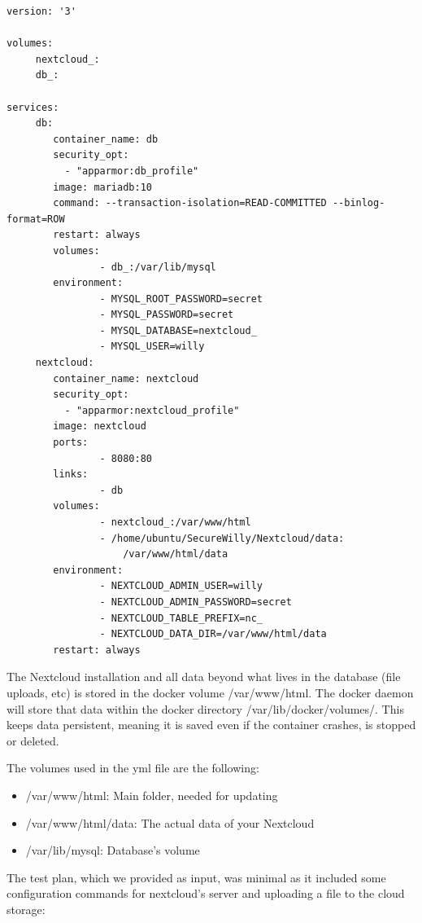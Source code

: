 \begin{lstlisting}[style=Dockerfile, caption={Nextcloud's docker-compose.yml}]
version: '3'

volumes:
     nextcloud_:
     db_:

services:
     db:
        container_name: db
        security_opt:
          - "apparmor:db_profile"
        image: mariadb:10
        command: --transaction-isolation=READ-COMMITTED --binlog-format=ROW
        restart: always
        volumes:
                - db_:/var/lib/mysql
        environment:
                - MYSQL_ROOT_PASSWORD=secret
                - MYSQL_PASSWORD=secret
                - MYSQL_DATABASE=nextcloud_
                - MYSQL_USER=willy
     nextcloud:
        container_name: nextcloud
        security_opt:
          - "apparmor:nextcloud_profile"
        image: nextcloud
        ports:
                - 8080:80
        links:
                - db
        volumes:
                - nextcloud_:/var/www/html
                - /home/ubuntu/SecureWilly/Nextcloud/data:
					/var/www/html/data
        environment:
                - NEXTCLOUD_ADMIN_USER=willy
                - NEXTCLOUD_ADMIN_PASSWORD=secret
                - NEXTCLOUD_TABLE_PREFIX=nc_
                - NEXTCLOUD_DATA_DIR=/var/www/html/data
        restart: always
\end{lstlisting}

The Nextcloud installation and all data beyond what lives in the database (file uploads, etc) is stored in the docker volume /var/www/html. The docker daemon will store that data within the docker directory /var/lib/docker/volumes/. This keeps data persistent, meaning it is saved even if the container crashes, is stopped or deleted.

The volumes used in the yml file are the following:
\begin{itemize}
\item /var/www/html: Main folder, needed for updating
\item /var/www/html/data: The actual data of your Nextcloud
\item /var/lib/mysql: Database's volume
\end{itemize}

The test plan, which we provided as input, was minimal as it included some configuration commands for nextcloud's server and uploading a file to the cloud storage:

